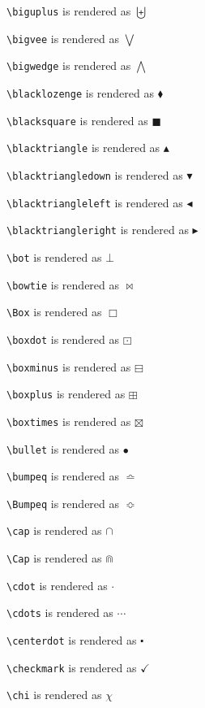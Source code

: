 \texttt{\textbackslash biguplus} is rendered as $\biguplus$


\texttt{\textbackslash bigvee} is rendered as $\bigvee$


\texttt{\textbackslash bigwedge} is rendered as $\bigwedge$


\texttt{\textbackslash blacklozenge} is rendered as $\blacklozenge$


\texttt{\textbackslash blacksquare} is rendered as $\blacksquare$


\texttt{\textbackslash blacktriangle} is rendered as $\blacktriangle$


\texttt{\textbackslash blacktriangledown} is rendered as $\blacktriangledown$


\texttt{\textbackslash blacktriangleleft} is rendered as $\blacktriangleleft$


\texttt{\textbackslash blacktriangleright} is rendered as $\blacktriangleright$


\texttt{\textbackslash bot} is rendered as $\bot$


\texttt{\textbackslash bowtie} is rendered as $\bowtie$


\texttt{\textbackslash Box} is rendered as $\Box$


\texttt{\textbackslash boxdot} is rendered as $\boxdot$


\texttt{\textbackslash boxminus} is rendered as $\boxminus$


\texttt{\textbackslash boxplus} is rendered as $\boxplus$


\texttt{\textbackslash boxtimes} is rendered as $\boxtimes$


\texttt{\textbackslash bullet} is rendered as $\bullet$


\texttt{\textbackslash bumpeq} is rendered as $\bumpeq$


\texttt{\textbackslash Bumpeq} is rendered as $\Bumpeq$


\texttt{\textbackslash cap} is rendered as $\cap$


\texttt{\textbackslash Cap} is rendered as $\Cap$


\texttt{\textbackslash cdot} is rendered as $\cdot$


\texttt{\textbackslash cdots} is rendered as $\cdots$


\texttt{\textbackslash centerdot} is rendered as $\centerdot$


\texttt{\textbackslash checkmark} is rendered as $\checkmark$


\texttt{\textbackslash chi} is rendered as $\chi$


